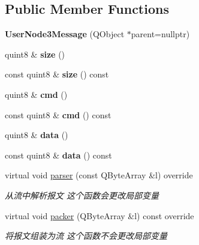 \subsection*{Public Member Functions}
\begin{DoxyCompactItemize}
\item 
\mbox{\label{class_user_node3_message_a2a7655b416835f17e20dc5650359575e}} 
{\bfseries User\+Node3\+Message} (Q\+Object $\ast$parent=nullptr)
\item 
\mbox{\label{class_user_node3_message_a6f384b452e22cb64f3770e077785e8f1}} 
quint8 \& {\bfseries size} ()
\item 
\mbox{\label{class_user_node3_message_aeb92325a44a9496747657a533da03821}} 
const quint8 \& {\bfseries size} () const
\item 
\mbox{\label{class_user_node3_message_a290be56a24bdf976d117c21c2935991a}} 
quint8 \& {\bfseries cmd} ()
\item 
\mbox{\label{class_user_node3_message_a81a303e36afe6535762fd91533cf4ff2}} 
const quint8 \& {\bfseries cmd} () const
\item 
\mbox{\label{class_user_node3_message_a173cf0fc8fe66b9e8f29246f89266602}} 
quint8 \& {\bfseries data} ()
\item 
\mbox{\label{class_user_node3_message_a27b8b9b255c81b4463d8e2fd3570e6fd}} 
const quint8 \& {\bfseries data} () const
\item 
virtual void \mbox{\hyperlink{class_user_node3_message_a5b5f3ff430543061048b9634079287d5}{parser}} (const Q\+Byte\+Array \&l) override
\begin{DoxyCompactList}\small\item\em 从流中解析报文 这个函数会更改局部变量 \end{DoxyCompactList}\item 
virtual void \mbox{\hyperlink{class_user_node3_message_a57755b35ef30f7e97a112c4747277d4a}{packer}} (Q\+Byte\+Array \&l) const override
\begin{DoxyCompactList}\small\item\em 将报文组装为流 这个函数不会更改局部变量 \end{DoxyCompactList}\end{DoxyCompactItemize}


